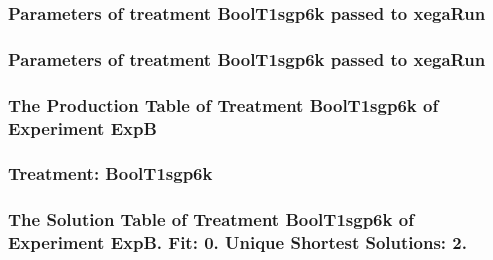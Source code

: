 \documentclass[18pt,c]{beamer}
\begin{document}

 \begin{frame}
 \fontsize{8pt}{9pt}\selectfont
 \frametitle{  Parameters of treatment BoolT1sgp6k passed to xegaRun
 }

 \label{ExpBtParmTable038.tex}  
 \end{frame}


 \begin{frame}
 \fontsize{8pt}{9pt}\selectfont
 \frametitle{  Parameters of treatment BoolT1sgp6k passed to xegaRun
 }

 \label{ExpBtParmTable039.tex}  
 \end{frame}

 \begin{frame}
 \fontsize{8pt}{9pt}\selectfont
 \frametitle{ The Production Table of Treatment BoolT1sgp6k of Experiment ExpB }

 \label{ExpBGrammarTable009.tex}  
 \end{frame}

 \begin{frame}
 \fontsize{8pt}{9pt}\selectfont
 \frametitle{ Treatment: BoolT1sgp6k }

 \label{ExpBStatsTable016.tex}  
 \end{frame}

 \begin{frame}
 \fontsize{8pt}{9pt}\selectfont
 \frametitle{ The Solution Table of Treatment BoolT1sgp6k of Experiment ExpB. Fit: 0. Unique Shortest Solutions: 2. }

 \label{ExpBSolutionTable009.tex}  
 \end{frame}
\end{document}
